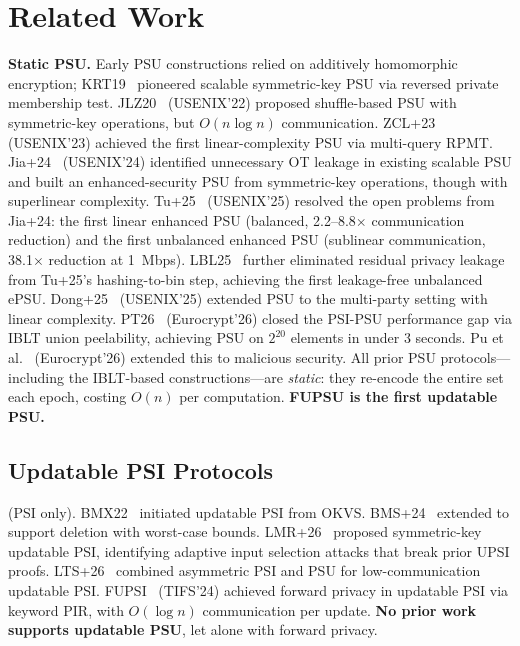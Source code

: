 \section{Related Work}
\label{sec:related}

\textbf{Static PSU.} Early PSU constructions relied on additively homomorphic
encryption; KRT19~\cite{KRT19} pioneered scalable symmetric-key PSU via
reversed private membership test. JLZ20~\cite{JLZ20} (USENIX'22) proposed shuffle-based
PSU with symmetric-key operations, but $O(n \log n)$ communication.
ZCL+23~\cite{ZCL+23} (USENIX'23) achieved the first linear-complexity PSU via
multi-query RPMT. Jia+24~\cite{Jia+24} (USENIX'24) identified unnecessary OT
leakage in existing scalable PSU and built an enhanced-security PSU from
symmetric-key operations, though with superlinear complexity. Tu+25~\cite{Tu+25}
(USENIX'25) resolved the open problems from Jia+24: the first linear enhanced
PSU (balanced, 2.2--8.8$\times$ communication reduction) and the first unbalanced
enhanced PSU (sublinear communication, 38.1$\times$ reduction at 1~Mbps).
LBL25~\cite{LBL25} further eliminated residual privacy leakage from
Tu+25's hashing-to-bin step, achieving the first leakage-free unbalanced ePSU.
Dong+25~\cite{Dong+25} (USENIX'25) extended PSU to the multi-party setting with
linear complexity. PT26~\cite{PT26} (Eurocrypt'26) closed the PSI-PSU
performance gap via IBLT union peelability, achieving PSU on $2^{20}$ elements
in under 3 seconds. Pu et al.~\cite{PuGT26} (Eurocrypt'26) extended this to
malicious security. All prior PSU protocols---including the IBLT-based
constructions---are \emph{static}: they re-encode the entire set each epoch,
costing $O(n)$ per computation. \textbf{FUPSU is the first updatable PSU.}

\subsection{Updatable PSI Protocols}
 (PSI only). BMX22~\cite{BMX22} initiated updatable
PSI from OKVS. BMS+24~\cite{BMS+24} extended to support deletion with
worst-case bounds. LMR+26~\cite{LMR+26} proposed symmetric-key updatable PSI,
identifying adaptive input selection attacks that break prior UPSI proofs.
LTS+26~\cite{LTS+26} combined asymmetric PSI and PSU for low-communication
updatable PSI. FUPSI~\cite{WZC+24} (TIFS'24) achieved forward privacy in
updatable PSI via keyword PIR, with $O(\log n)$ communication per update.
\textbf{No prior work supports updatable PSU}, let alone with forward privacy.


